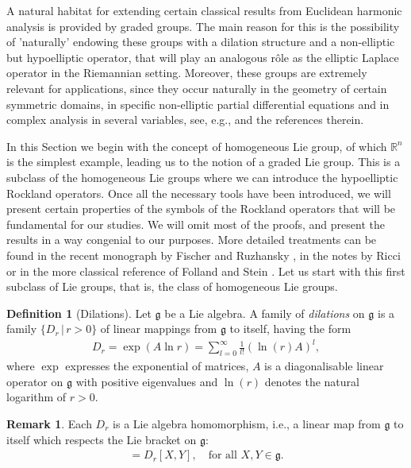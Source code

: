 \documentclass[12pt,oneside,a4paper]{book}
\numberwithin{equation}{section}     %
\theoremstyle{plain}
\theoremstyle{definition}
\newtheorem{definition}[theorem]{Definition}
\newtheorem{remark}[theorem]{Remark}
\newcommand{\R}{{\mathbb R}}
\newcommand{\Rn}{{\R}^n}
\begin{document}
A natural habitat for extending certain classical results from Euclidean harmonic analysis is provided by graded groups. The main reason for this is the possibility of 'naturally' endowing these groups with a dilation structure and a non-elliptic but hypoelliptic operator, that will play an analogous r\^ole as the elliptic Laplace operator in the Riemannian setting. Moreover, these groups are extremely relevant for applications, since they occur naturally in the geometry of certain symmetric domains, in specific non-elliptic partial differential equations and in complex analysis in several variables, see, e.g., \cite{BFG2016,BLU,CRS2005,VSC1992} and the references therein.

In this Section we begin with the concept of homogeneous Lie group, of which $\Rn$ is the simplest example, leading us to the notion of a graded Lie group. This is a subclass of the homogeneous Lie groups where we can introduce the hypoelliptic Rockland operators. Once all the necessary tools have been introduced, we will present certain properties of the symbols of the Rockland operators that will be fundamental for our studies. We will omit most of the proofs, and present the results in a way congenial to our purposes. More detailed treatments can be found in the recent monograph by Fischer and Ruzhansky \cite{FR2016}, in the notes by Ricci \cite{Ric} or in the more classical reference of Folland and Stein \cite{FS}. 
Let us start with this first subclass of Lie groups, that is, the class of homogeneous Lie groups.
\begin{definition}[Dilations]
	Let $\mathfrak{g}$ be a Lie algebra. A family of \textit{dilations} on $\mathfrak{g}$ is a family $\{D_r\,|\, r>0\}$ of linear mappings from $\mathfrak{g}$ to itself, having the form 
	\begin{align*}
	D_r=\exp(A\ln r)=\sum_{l=0}^{\infty}\frac{1}{l!}(\ln(r)A)^l,
	\end{align*}
	where $\exp$ expresses the exponential of matrices, $A$ is a diagonalisable linear operator on $\mathfrak{g}$ with positive eigenvalues and $\ln(r)$ denotes the natural logarithm of $r>0$. 
\end{definition}
\begin{remark}
	Each $D_r$ is a Lie algebra homomorphism, i.e., a linear map from $\mathfrak{g}$ to itself which respects the Lie bracket on $\mathfrak{g}$:
	\begin{align*}
	[D_rX,D_rY]=D_r[X,Y],\quad\text{for all }X,Y\in\mathfrak{g}.
	\end{align*}
\end{remark}
\end{document}
